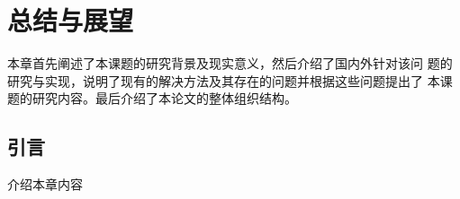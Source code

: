 \chapter{总结与展望}
本章首先阐述了本课题的研究背景及现实意义，然后介绍了国内外针对该问 题的研究与实现，说明了现有的解决方法及其存在的问题并根据这些问题提出了 本课题的研究内容。最后介绍了本论文的整体组织结构。
\section{引言}
介绍本章内容